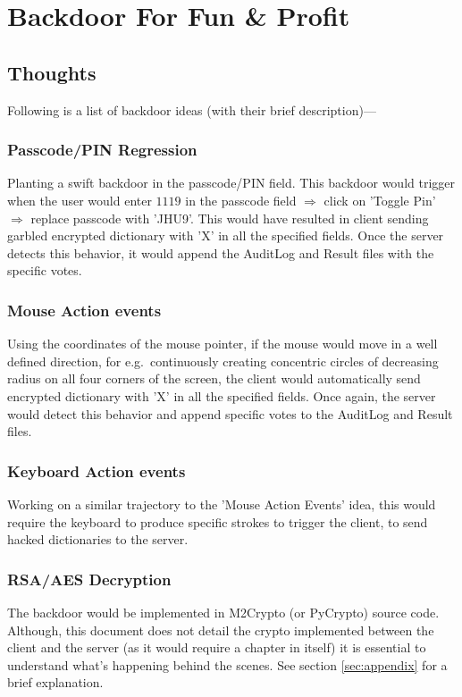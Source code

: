 \section{Backdoor For Fun \& Profit}
\label{sec:backdoor}

\subsection{Thoughts}

Following is a list of backdoor ideas (with their brief description)---

\subsubsection{Passcode/PIN Regression}
Planting a swift backdoor in the passcode/PIN field. This backdoor would trigger when the user would enter $1119$ in the passcode field $\Rightarrow$ click on 'Toggle Pin' $\Rightarrow$ replace passcode with 'JHU9'. This would have resulted in client sending garbled encrypted dictionary with 'X' in all the specified fields. Once the server detects this behavior, it would append the AuditLog and Result files with the specific votes.

\subsubsection{Mouse Action events}
Using the coordinates of the mouse pointer, if the mouse would move in a well defined direction, for e.g.\ continuously creating concentric circles of decreasing radius on all four corners of the screen, the client would automatically send encrypted dictionary with 'X' in all the specified fields. Once again, the server would detect this behavior and append specific votes to the AuditLog and Result files.

\subsubsection{Keyboard Action events}
Working on a similar trajectory to the 'Mouse Action Events' idea, this would require the keyboard to produce specific strokes to trigger the client, to send hacked dictionaries to the server.

\subsubsection{RSA/AES Decryption}
The backdoor would be implemented in M2Crypto (or PyCrypto) source code. Although, this document does not detail the crypto implemented between the client and the server (as it would require a chapter in itself) it is essential to understand what's happening behind the scenes. See section \ref{sec:appendix} for a brief explanation.
	
